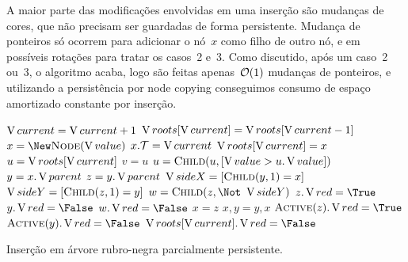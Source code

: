 \documentclass[main.tex]{subfiles}
\begin{document}
A maior parte das modificações envolvidas em uma inserção são mudanças de cores, que não precisam ser guardadas de forma persistente. Mudança de ponteiros só ocorrem para adicionar o nó~$x$ como filho de outro nó, e em possíveis rotações para tratar os casos~2 e~3. Como discutido, após um caso~2 ou~3, o algoritmo acaba, logo são feitas apenas~$\mathcal{O}(1)$ mudanças de ponteiros, e utilizando a persistência por node copying conseguimos consumo de espaço amortizado constante por inserção.

\begin{algorithm}
\begin{algorithmic}[1]

	\State $\operatorname{V}{current} = \operatorname{V}{current} + 1$
	\State $\operatorname{V}{roots}[\operatorname{V}{current}] = \operatorname{V}{roots}[\operatorname{V}{current} - 1]$
	\State $x = \New \Call{Node}{\val}$  \label{line:insrb:insb}
	\State $x.\mathcal{T} = \operatorname{V}{current}$
	\If{$\roots[\cur] = \Null$}
		\State $\operatorname{V}{roots}[\operatorname{V}{current}] = x$
	\Else
		\State $u = \operatorname{V}{roots}[\operatorname{V}{current}]$
		  \label{line:insrb:whilefind}
			\State $v = u$
			\State $u = \Call{Child}{u, [\val > u.\val]}$
		\EndWhile
		\State {}
	\EndIf \label{line:insrb:inse}
	 \label{line:insrb:loopb}
		\State $y = x.\operatorname{V}{parent}$ \label{line:insrb:xyzwb}
		\State $z = y.\operatorname{V}{parent}$
		\State $\V{sideX} = [\Call{Child}{y, 1} = x]$
		\State $\V{sideY} = [\Call{Child}{z, 1} = y]$ \label{line:insrb:xyzwe}
		\State $w = \Call{Child}{z, \Not\ \V{sideY}}$
		  \label{line:insrb:c1b}
			\State $z.\red = \True$
			\State $y.\red = \False$
			\State $w.\red = \False$
			\State $x = z$ \label{line:insrb:c1e}
		\Else
			  \label{line:insrb:c3b}
				\State {}
				\State $x, y = y, x$  \label{line:insrv:c3e}
			\EndIf
			\State {}  \label{line:insrb:c2b}
			\State $\Call{Active}{z}.\red = \True$ \label{line:insrb:act1}
			\State $\Call{Active}{y}.\red = \False$ \label{line:insrb:act2}
			\State \Break \label{line:insrb:c2e}
		\EndIf
	\EndWhile
	\State $\roots[\cur].\red = \False$  \label{line:insrb:loope}
\EndFunction
\end{algorithmic}
\caption{Inserção em árvore rubro-negra parcialmente persistente.} \label{lst:ins_rb}
\end{algorithm}
\end{document}
